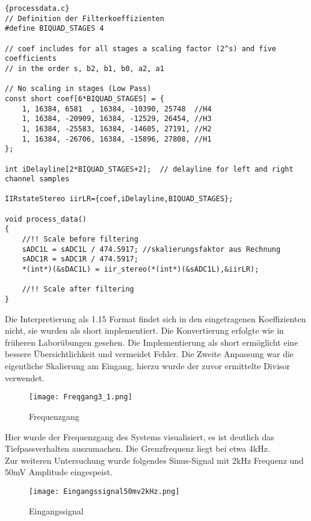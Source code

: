 \begin{adjustbox}{width=\textwidth,height=\textheight,keepaspectratio}
 \begin{lstlisting}[title=processdata.c]{processdata.c}
// Definition der Filterkoeffizienten
#define BIQUAD_STAGES 4

// coef includes for all stages a scaling factor (2^s) and five coefficients
// in the order s, b2, b1, b0, a2, a1

// No scaling in stages (Low Pass)
const short coef[6*BIQUAD_STAGES] = {
	1, 16384, 6581	, 16384, -10390, 25748  //H4
	1, 16384, -20909, 16384, -12529, 26454, //H3
	1, 16384, -25583, 16384, -14605, 27191, //H2
	1, 16384, -26706, 16384, -15896, 27808, //H1
};

int iDelayline[2*BIQUAD_STAGES+2];	// delayline for left and right channel samples

IIRstateStereo iirLR={coef,iDelayline,BIQUAD_STAGES};

void process_data()
{
	//!! Scale before filtering
	sADC1L = sADC1L / 474.5917; //skalierungsfaktor aus Rechnung
	sADC1R = sADC1R / 474.5917;
	*(int*)(&sDAC1L) = iir_stereo(*(int*)(&sADC1L),&iirLR);

	//!! Scale after filtering
}

\end{lstlisting}
\end{adjustbox}
Die Interpretierung als 1.15 Format findet sich in den eingetragenen Koeffizienten nicht, sie wurden als short implementiert. Die Konvertierung erfolgte wie in früheren Laborübungen gesehen. Die Implementierung als short ermöglicht eine bessere Übersichtlichkeit und vermeidet Fehler. Die Zweite Anpassung war die eigentliche Skalierung am Eingang, hierzu wurde der zuvor ermittelte Divisor verwendet.\\
\begin{figure}[H]
  \centering
    \texttt{[image: Freqgang3\_1.png]}
  \caption{Frequenzgang}
  \label{fig:Freqgang3_1}
\end{figure}
Hier wurde der Frequenzgang des Systems visualisiert, es ist deutlich das Tiefpassverhalten auszumachen. Die Grenzfrequenz liegt bei etwa 4kHz.\\
Zur weiteren Untersuchung wurde folgendes Sinus-Signal mit 2kHz Frequenz und 50mV Amplitude eingespeist.
\begin{figure}[H]
  \centering
    \texttt{[image: Eingangssignal50mv2kHz.png]}
  \caption{Eingangssignal}
  \label{fig:Eingangssignal50mv2kHz}
\end{figure}
